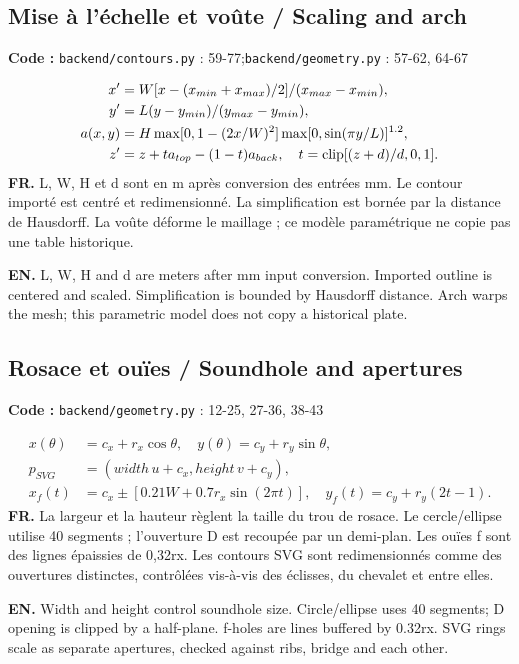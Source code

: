 \documentclass[10pt,a4paper]{article}
\newcommand{\FR}[1]{\textbf{FR.} #1\par}\newcommand{\EN}[1]{{\selectlanguage{english}\textbf{EN.} #1\par}}
\newcommand{\loc}[1]{{\small\color{ink}\textbf{Code :} #1\par}}
\begin{document}
\begin{samepage}\subsection{Mise à l’échelle et voûte / Scaling and arch}
\loc{\texttt{backend/contours.py} : 59-77;\allowbreak\quad \texttt{backend/geometry.py} : 57-62, 64-67}
\begin{align}x'&=W[x-(x_{min}+x_{max})/2]/(x_{max}-x_{min}),\\
y'&=L(y-y_{min})/(y_{max}-y_{min}),\\
a(x,y)&=H\max[0,1-(2x/W)^2]\max[0,\sin(\pi y/L)]^{1.2},\\
z'&=z+t a_{top}-(1-t)a_{back},\quad t=\operatorname{clip}[(z+d)/d,0,1].\end{align}
\FR{L, W, H et d sont en m après conversion des entrées mm. Le contour importé est centré et redimensionné. La simplification est bornée par la distance de Hausdorff. La voûte déforme le maillage ; ce modèle paramétrique ne copie pas une table historique.}
\EN{L, W, H and d are meters after mm input conversion. Imported outline is centered and scaled. Simplification is bounded by Hausdorff distance. Arch warps the mesh; this parametric model does not copy a historical plate.}
\end{samepage}
\begin{samepage}\subsection{Rosace et ouïes / Soundhole and apertures}
\loc{\texttt{backend/geometry.py} : 12-25, 27-36, 38-43}
\begin{align}x(\theta)&=c_x+r_x\cos\theta,\quad y(\theta)=c_y+r_y\sin\theta,\\
p_{SVG}&=(width\,u+c_x,height\,v+c_y),\\
x_f(t)&=c_x\pm[0.21W+0.7r_x\sin(2\pi t)],\quad y_f(t)=c_y+r_y(2t-1).\end{align}
\FR{La largeur et la hauteur règlent la taille du trou de rosace. Le cercle/ellipse utilise 40 segments ; l’ouverture D est recoupée par un demi-plan. Les ouïes f sont des lignes épaissies de 0,32rx. Les contours SVG sont redimensionnés comme des ouvertures distinctes, contrôlées vis-à-vis des éclisses, du chevalet et entre elles.}
\EN{Width and height control soundhole size. Circle/ellipse uses 40 segments; D opening is clipped by a half-plane. f-holes are lines buffered by 0.32rx. SVG rings scale as separate apertures, checked against ribs, bridge and each other.}
\end{samepage}
\end{document}
